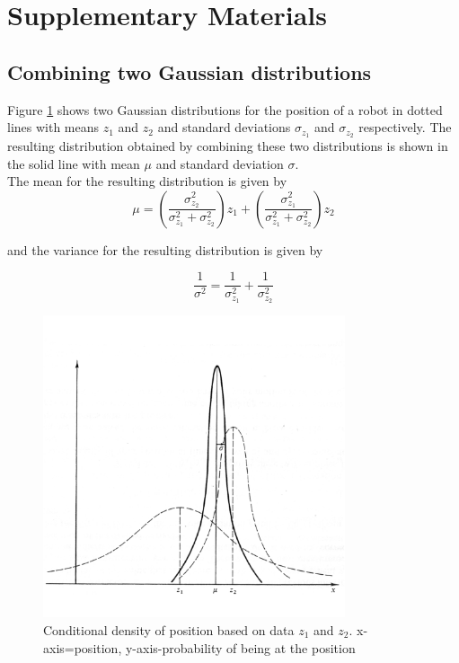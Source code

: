 \documentclass[conference]{IEEEtran}
\begin{document}
\section{Supplementary Materials}
\subsection{Combining two Gaussian distributions}
\label{sssec:num1} 
Figure \ref{CombineGaussians} shows two Gaussian distributions for the position of a robot in dotted lines with means $z_1$ and $z_2$ and standard deviations $\sigma_{z_1}$ and $\sigma_{z_2}$ respectively. The resulting distribution obtained by combining these two distributions is shown in the solid line with mean $\mu$ and standard deviation $\sigma$.\\

The mean for the resulting distribution is given by\cite{maybeck}
\begin{equation}\label{CombinedMean}
\mu = (\frac{\sigma_{z_2}^2}{\sigma_{z_1}^2 + \sigma_{z_2}^2})z_1 + (\frac{\sigma_{z_1}^2}{\sigma_{z_1}^2 + \sigma_{z_2}^2})z_2
\end{equation}

and the variance for the resulting distribution is given by

\begin{equation}\label{CombinedVariance}
\frac{1}{\sigma^2}=\frac{1}{\sigma_{z_1}^2}+\frac{1}{\sigma_{z_2}^2}
\end{equation}

\begin{figure}
\centering
\includegraphics[width=3.5in, height=3.5in]{./figures/CombineGaussians.png}
\caption{Conditional density of position based on data $z_1$ and $z_2$\cite{maybeck}. x-axis=position, y-axis-probability of being at the position}
\label{CombineGaussians}
\end{figure}
\end{document}
